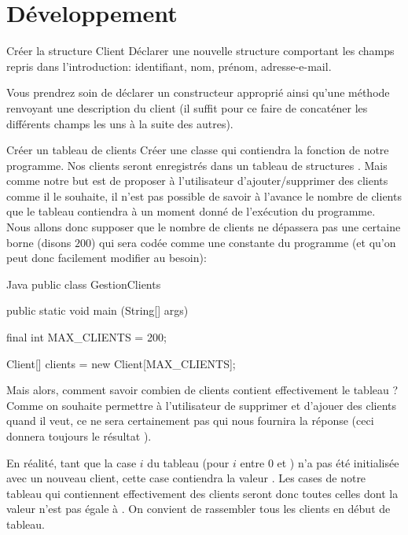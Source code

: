 \documentclass[a4paper,11pt]{article}
\begin{document}
\newpage 

\section{D\'eveloppement}


 	\begin{Exercice}{Créer la structure Client}
		D\'eclarer une nouvelle structure  comportant les champs repris dans l'introduction: identifiant, nom, prénom, adresse-e-mail.
		
		Vous prendrez soin de d\'eclarer un constructeur appropri\'e ainsi qu'une m\'ethode  renvoyant une description du client (il suffit pour ce faire de concat\'ener les diff\'erents champs les uns \`a la suite des autres).
		
	\end{Exercice} 

 
 	\begin{Exercice}{Cr\'eer un tableau de clients}
	Cr\'eer une classe  qui contiendra la fonction  de notre programme. Nos clients seront enregistr\'es dans un tableau de structures . Mais comme notre but est de proposer \`a l'utilisateur d'ajouter/supprimer des clients comme il le souhaite, il n'est pas possible de savoir \`a l'avance le nombre de clients que le tableau contiendra \`a un moment donn\'e de l'ex\'ecution du programme. Nous allons donc supposer que le nombre de clients ne dépassera pas une certaine borne (disons $200$) qui sera cod\'ee comme une constante du programme (et qu'on peut donc facilement modifier au besoin):
	
		\begin{Code}{Java} 
			public class GestionClients
			{	
				public static void main (String[] args)
				{
				        final int MAX_CLIENTS = 200;
				        				
				        Client[] clients = new Client[MAX_CLIENTS];
				}
			}
		\end{Code}
Mais alors, comment savoir combien de clients contient effectivement le tableau ? Comme on souhaite permettre \`a l'utilisateur de supprimer et d'ajouer des clients quand il veut, ce ne sera certainement pas  qui nous fournira la réponse (ceci donnera toujours le r\'esultat ).

En réalité, tant que la case $i$ du tableau (pour $i$ entre $0$ et ) n'a pas été initialisée avec un nouveau client, cette case contiendra la valeur . Les cases de notre tableau qui contiennent effectivement des clients seront donc toutes celles dont la valeur n'est pas égale à . On convient de rassembler tous les clients en d\'ebut de tableau.
\end{Exercice}	
\end{document}
